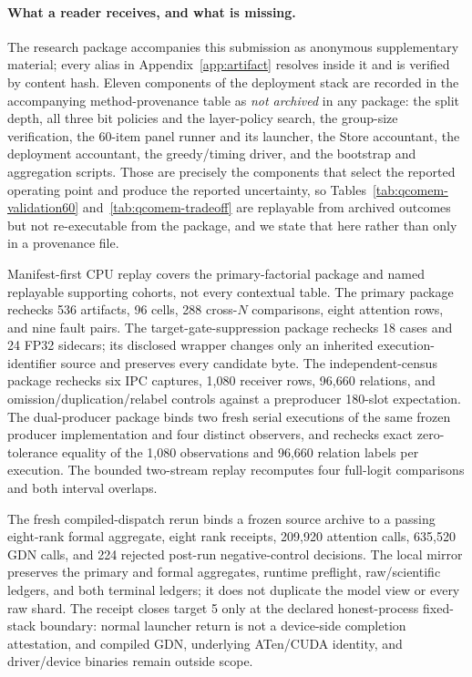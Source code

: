 \documentclass{article}
\begin{document}
\paragraph{What a reader receives, and what is missing.}
The research package accompanies this submission as anonymous supplementary
material; every alias in Appendix~\ref{app:artifact} resolves inside it and is
verified by content hash.  Eleven components of the deployment stack are
recorded in the accompanying method-provenance table as \emph{not archived} in
any package: the split depth, all three bit policies and the layer-policy
search, the group-size verification, the 60-item panel runner and its launcher,
the Store accountant, the deployment accountant, the greedy/timing driver, and
the bootstrap and aggregation scripts.  Those are precisely the components that
select the reported operating point and produce the reported uncertainty, so
Tables~\ref{tab:qcomem-validation60} and~\ref{tab:qcomem-tradeoff} are
replayable from archived outcomes but not re-executable from the package, and we
state that here rather than only in a provenance file.

Manifest-first CPU replay covers the primary-factorial package and named
replayable supporting cohorts, not every contextual table.  The primary package
rechecks 536 artifacts, 96 cells, 288 cross-$N$ comparisons, eight attention
rows, and nine fault pairs.  The target-gate-suppression package rechecks 18
cases and 24 FP32 sidecars; its disclosed wrapper changes only an inherited
execution-identifier source and preserves every candidate byte.  The
independent-census package rechecks six IPC captures, 1,080 receiver rows,
96,660 relations, and omission/duplication/relabel controls against a
preproducer 180-slot expectation.  The dual-producer package binds two fresh
serial executions of the same frozen producer implementation and four distinct
observers, and rechecks exact zero-tolerance equality of the 1,080 observations
and 96,660 relation labels per execution.  The
bounded two-stream replay recomputes four full-logit comparisons and both
interval overlaps.

The fresh compiled-dispatch rerun binds a frozen source archive to a passing
eight-rank formal aggregate, eight rank receipts, 209,920 attention calls,
635,520 GDN calls, and 224 rejected post-run negative-control decisions.  The
local mirror preserves the primary and formal aggregates, runtime preflight,
raw/scientific ledgers, and both terminal ledgers; it does not duplicate the
model view or every raw shard.  The receipt closes target 5 only at the
declared honest-process fixed-stack boundary: normal launcher return is not a
device-side completion attestation, and compiled GDN, underlying ATen/CUDA
identity, and driver/device binaries remain outside scope.
\end{document}
